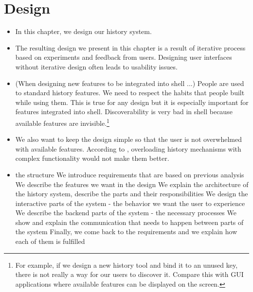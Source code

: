 
\chapter{Design}



\begin{itemize}
    \item In this chapter, we design our history system.
    \item The resulting design we present in this chapter is a result of iterative process based on experiments and feedback from users. Designing user interfaces without iterative design often leads to usability issues.\cite{nielsen1993iterative}
    \item (When designing new features to be integrated into shell ...) People are used to standard history features. We need to respect the habits that people built while using them. This is true for any design but it is especially important for features integrated into shell. Discoverability is very bad in shell because available features are invisible.\footnote{For example, if we design a new history tool and bind it to an unused key, there is not really a way for our users to discover it. Compare this with GUI applications where available features can be displayed on the screen.}
    \item We also want to keep the design simple so that the user is not overwhelmed with available features. According to \cite{greenberg1993computer}, overloading history mechanisms with complex functionality would not make them better.
    \item the structure
    \subitem We introduce requirements that are based on previous analysis
    \subitem We describe the features we want in the design
    \subitem We explain the architecture of the history system, describe the parts and their responsibilities
    \subitem We design the interactive parts of the system - the behavior we want the user to experience
    \subitem We describe the backend parts of the system - the necessary processes
    \subitem We show and explain the communication that needs to happen between parts of the system
    \subitem Finally, we come back to the requirements and we explain how each of them is fulfilled
\end{itemize}





